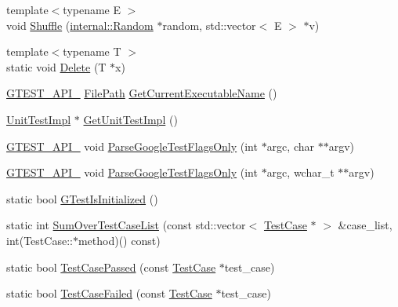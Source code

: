 \begin{DoxyCompactItemize}
\item 
{\footnotesize template$<$typename E $>$ }\\void \hyperlink{namespacetesting_1_1internal_a955e3f72f36c9db3a1165517010f52a3}{\-Shuffle} (\hyperlink{classtesting_1_1internal_1_1Random}{internal\-::\-Random} $\ast$random, std\-::vector$<$ \-E $>$ $\ast$v)
\item 
{\footnotesize template$<$typename T $>$ }\\static void \hyperlink{namespacetesting_1_1internal_a9e0b8eb07b3eef24b40b4bbe03bd11be}{\-Delete} (\-T $\ast$x)
\item 
\hyperlink{gtest-port_8h_aa73be6f0ba4a7456180a94904ce17790}{\-G\-T\-E\-S\-T\-\_\-\-A\-P\-I\-\_\-} \hyperlink{classtesting_1_1internal_1_1FilePath}{\-File\-Path} \hyperlink{namespacetesting_1_1internal_a4fc348184f2bc16ec2270cffb38de5dc}{\-Get\-Current\-Executable\-Name} ()
\item 
\hyperlink{classtesting_1_1internal_1_1UnitTestImpl}{\-Unit\-Test\-Impl} $\ast$ \hyperlink{namespacetesting_1_1internal_a3ae874a4030c4aa27d77d67bf08d9e1d}{\-Get\-Unit\-Test\-Impl} ()
\item 
\hyperlink{gtest-port_8h_aa73be6f0ba4a7456180a94904ce17790}{\-G\-T\-E\-S\-T\-\_\-\-A\-P\-I\-\_\-} void \hyperlink{namespacetesting_1_1internal_a5655276556ac09c8d184920553da3e90}{\-Parse\-Google\-Test\-Flags\-Only} (int $\ast$argc, char $\ast$$\ast$argv)
\item 
\hyperlink{gtest-port_8h_aa73be6f0ba4a7456180a94904ce17790}{\-G\-T\-E\-S\-T\-\_\-\-A\-P\-I\-\_\-} void \hyperlink{namespacetesting_1_1internal_ae231639ccb18f92df31567b3eca47ac9}{\-Parse\-Google\-Test\-Flags\-Only} (int $\ast$argc, wchar\-\_\-t $\ast$$\ast$argv)
\item 
static bool \hyperlink{namespacetesting_1_1internal_a0554a55a03dae7d40e8ba569dac7848f}{\-G\-Test\-Is\-Initialized} ()
\item 
static int \hyperlink{namespacetesting_1_1internal_a9be4a7736e0e7d8754551c6a827c376d}{\-Sum\-Over\-Test\-Case\-List} (const std\-::vector$<$ \hyperlink{classtesting_1_1TestCase}{\-Test\-Case} $\ast$ $>$ \&case\-\_\-list, int(\-Test\-Case\-::$\ast$method)() const)
\item 
static bool \hyperlink{namespacetesting_1_1internal_ac961033179851d1a8ff0e009ddeece03}{\-Test\-Case\-Passed} (const \hyperlink{classtesting_1_1TestCase}{\-Test\-Case} $\ast$test\-\_\-case)
\item 
static bool \hyperlink{namespacetesting_1_1internal_a9cc56cc516fd6f9e3e1d7ab2183e5b2c}{\-Test\-Case\-Failed} (const \hyperlink{classtesting_1_1TestCase}{\-Test\-Case} $\ast$test\-\_\-case)

\end{DoxyCompactItemize}

